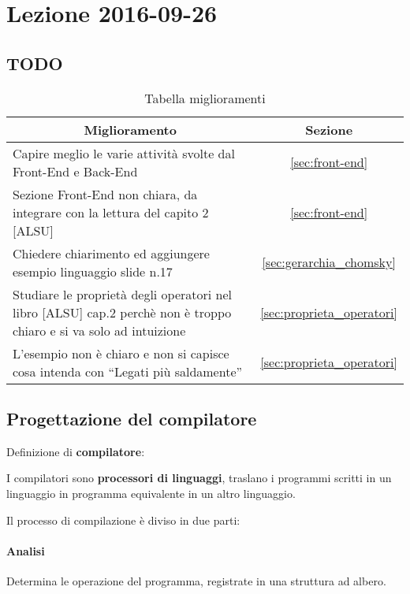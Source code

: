 \section{Lezione 2016-09-26}
\subsection{TODO}
\begin{table}[ht]
\begin{center}
\begin{tabular}{|p{\textwidth}|c|}
\hline
\multicolumn{1}{|c|}{\textbf{Miglioramento}} & \textbf{Sezione} \\ \hline
Capire meglio le varie attività svolte dal Front-End e Back-End &
\ref{sec:front-end} \\ \hline
Sezione Front-End non chiara, da integrare con la lettura del capito 2 [ALSU] &
\ref{sec:front-end} \\ \hline
Chiedere chiarimento ed aggiungere esempio linguaggio slide n.17 &
\ref{sec:gerarchia_chomsky} \\ \hline
Studiare le proprietà degli operatori nel libro [ALSU] cap.2 perchè non è troppo
chiaro e si va solo ad intuizione &
\ref{sec:proprieta_operatori} \\ \hline
L'esempio non è chiaro e non si capisce cosa intenda con ``Legati più
saldamente'' &
\ref{sec:proprieta_operatori} \\ \hline
\end{tabular}
\end{center}
\caption{Tabella miglioramenti}
\label{tab:tab_todo_2}
\end{table}

\subsection{Progettazione del compilatore}
\label{sec:progettazione_compilatore}
Definizione di \textbf{compilatore}:

\begin{definition}
I compilatori sono \textbf{processori di linguaggi}, traslano i programmi
scritti in un linguaggio in programma equivalente in un altro linguaggio.
\end{definition}

Il processo di compilazione è diviso in due parti:
\paragraph{Analisi}
Determina le operazione del programma, registrate in una struttura ad albero.
